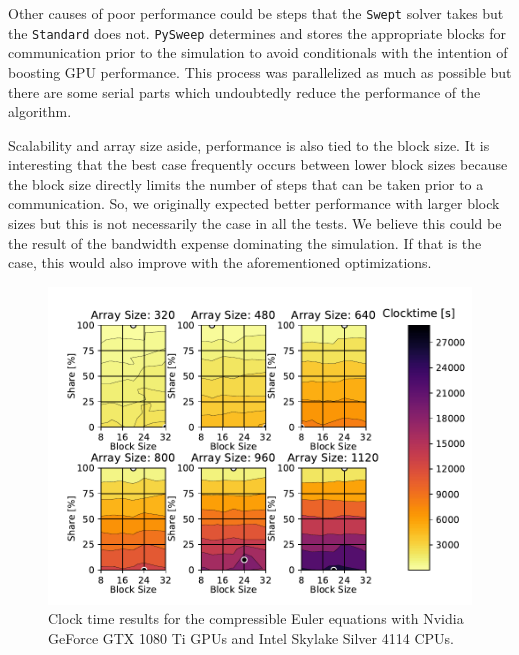 \documentclass[preprints,article,accept,moreauthors,pdftex]{Definitions/mdpi}
\def\pysweep{\texttt{PySweep}}
\def\Swept{\texttt{Swept}}
\def\Standard{\texttt{Standard}}
\newcommand\fs{0.7}
\def\oldCPU{Intel Skylake Silver 4114} %
\def\oldGPU{Nvidia GeForce GTX 1080 Ti}
\begin{document}
Other causes of poor performance could be steps that the \Swept{} solver takes but the \Standard{} does not. \pysweep{} determines and stores the appropriate blocks for communication prior to the simulation to avoid conditionals with the intention of boosting GPU performance. This process was parallelized as much as possible but there are some serial parts which undoubtedly reduce the performance of the algorithm. 

Scalability and array size aside, performance is also tied to the block size. It is interesting that the best case frequently occurs between lower block sizes because the block size directly limits the number of steps that can be taken prior to a communication. So, we originally expected better performance with larger block sizes but this is not necessarily the case in all the tests. We believe this could be the result of the bandwidth expense dominating the simulation. If that is the case, this would also improve with the aforementioned optimizations.


\begin{figure}[H]
    
    \begin{center}
        \includegraphics[scale=\fs, trim={0.5cm 0.4cm 0.5cm 0.2cm},clip]{figs/clockTimeSwepteulerOld.pdf}
        \caption{Clock time results  for the compressible Euler equations with \oldGPU{} GPUs and \oldCPU{} CPUs.}
        \label{fig:clocktimeOldEuler}
    \end{center}
\end{figure}
\end{document}
